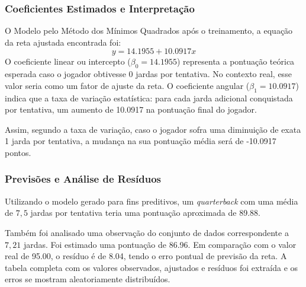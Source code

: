 \documentclass{article}
\begin{document}
\subsubsection{Coeficientes Estimados e Interpretação}
O Modelo pelo Método dos Mínimos Quadrados após o treinamento, a equação da reta ajustada encontrada foi:
\begin{equation}
    y = 14.1955 + 10.0917x
\end{equation}
O coeficiente linear ou intercepto ($\beta_0 = 14.1955$) representa a pontuação teórica esperada caso o jogador obtivesse $0$ jardas por tentativa. No contexto real, esse valor seria como um fator de ajuste da reta. O coeficiente angular ($\beta_1 = 10.0917$) indica que a taxa de variação estatística: para cada jarda adicional conquistada por tentativa, um aumento de 10.0917 na pontuação final do jogador. 

Assim, segundo a taxa de variação, caso o jogador sofra uma diminuição de exata 1 jarda por tentativa, a mudança na sua pontuação média será de -10.0917 pontos.

\subsubsection{Previsões e Análise de Resíduos}
Utilizando o modelo gerado para fins preditivos, um \textit{quarterback} com uma média de $7,5$ jardas por tentativa teria uma pontuação aproximada de 89.88. 

Também foi analisado uma observação do conjunto de dados correspondente a $7,21$ jardas. Foi estimado uma pontuação de 86.96. Em comparação com o valor real de 95.00, o resíduo é de 8.04, tendo o erro pontual de previsão da reta. A tabela completa com os valores observados, ajustados e resíduos foi extraída e os erros se mostram aleatoriamente distribuídos.
\end{document}
